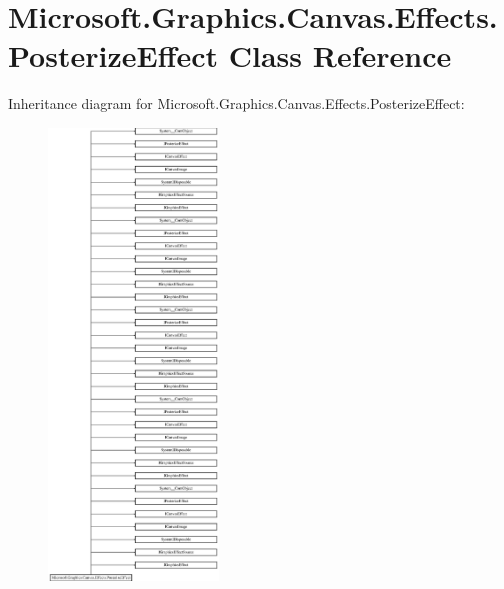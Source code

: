 \hypertarget{class_microsoft_1_1_graphics_1_1_canvas_1_1_effects_1_1_posterize_effect}{}\section{Microsoft.\+Graphics.\+Canvas.\+Effects.\+Posterize\+Effect Class Reference}
\label{class_microsoft_1_1_graphics_1_1_canvas_1_1_effects_1_1_posterize_effect}
Inheritance diagram for Microsoft.\+Graphics.\+Canvas.\+Effects.\+Posterize\+Effect\+:\begin{figure}[H]
\begin{center}
\leavevmode
\includegraphics[height=12.000000cm]{class_microsoft_1_1_graphics_1_1_canvas_1_1_effects_1_1_posterize_effect}
\end{center}
\end{figure}
